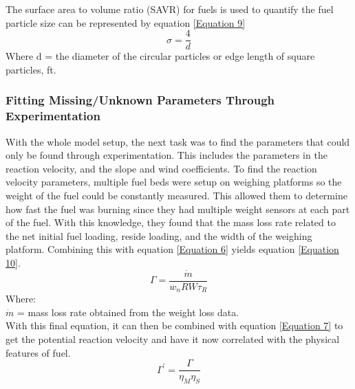 \documentclass{article}
\begin{document}
\indent The surface area to volume ratio (SAVR) for fuels is used to quantify the fuel particle size can be represented by equation \ref{Equation 9}
\begin{equation}
	\label{Equation 9}
	\sigma = \frac {4} {d} 
\end{equation}
 Where d = the diameter of the circular particles or edge length of square particles, ft.
 \subsubsection{Fitting Missing/Unknown Parameters Through Experimentation}
 \indent With the whole model setup, the next task was to find the parameters that could only be found through experimentation. This includes the parameters in the reaction velocity, and the slope and wind coefficients. To find the reaction velocity parameters, multiple fuel beds were setup on weighing platforms so the weight of the fuel could be constantly measured. This allowed them to determine how fast the fuel was burning since they had multiple weight sensors at each part of the fuel. With this knowledge, they found that the mass loss rate related to the net initial fuel loading, reside loading, and the width of the weighing platform. Combining this with equation \ref{Equation 6} yields equation \ref{Equation 10}.
 \begin{equation}
 	\label{Equation 10}
 	\Gamma = \frac {\dot m } {w_n RW \tau _ R} 
 \end{equation}
 Where: \\
 $\dot m$ = mass loss rate obtained from the weight loss data. \\
 \indent With this final equation, it can then be combined with equation \ref{Equation 7} to get the potential reaction velocity and have it now correlated with the physical features of fuel. 
 \begin{equation}
 	\label{Equation 11}
 	\Gamma ^ {'} = \frac {\Gamma} {\eta _ M \eta _ S}
 \end{equation}
 
\end{document}
